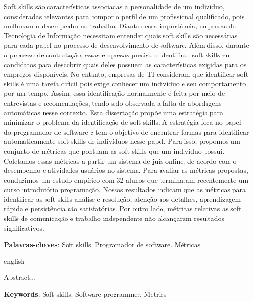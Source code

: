 \documentclass{ppgi}
\begin{document}
\begin{resumo}

Soft skills são características associadas a personalidade de um indivíduo, consideradas relevantes para compor o perfil de um profissional qualificado, pois melhoram o desempenho no trabalho. Diante dessa importância, empresas de Tecnologia de Informação necessitam entender quais soft skills são necessárias para cada papel no processo de desenvolvimento de software. Além disso, durante o processo de contratação, essas empresas precisam identificar soft skills em candidatos para descobrir quais deles possuem as características exigidas para os empregos disponíveis.
No entanto, empresas de TI consideram que identificar soft skills é uma tarefa difícil pois exige conhecer um indivíduo e seu comportamento por um tempo. Assim, essa identificação normalmente é feita por meio de entrevistas e recomendações, tendo sido observada a falta de abordagens automáticas nesse contexto.
Esta dissertação propõe uma estratégia para minimizar o problema da identificação de soft skills. A estratégia foca no papel do programador de software e tem o objetivo de encontrar formas para identificar automaticamente soft skills de indivíduos nesse papel. Para isso, propomos um conjunto de métricas que pontuam as soft skills que um indivíduo possui. Coletamos essas métricas a partir um sistema de juiz online, de acordo com o desempenho e atividades usuários no sistema.
Para avaliar as métricas propostas, conduzimos um estudo empírico com 32 alunos que terminaram recentemente um curso introdutório programação. Nossos resultados indicam que as métricas para identificar as soft skills análise e resolução, atenção aos detalhes, aprendizagem rápida e persistência são satisfatórias. Por outro lado, métricas relativas as soft skills de comunicação e trabalho independente não alcançaram resultados significativos.

\posresumo

\textbf{Palavras-chaves}: Soft skills. Programador de software. Métricas
\end{resumo}

\begin{resumo}[Abstract]
\begin{otherlanguage*}{english}

Abstract...

\posresumo

\textbf{Keywords}: Soft skills. Software programmer. Metrics
\end{otherlanguage*}
\end{resumo}
\end{document}
